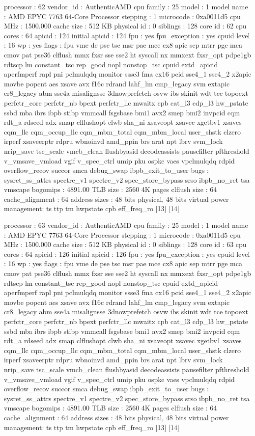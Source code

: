processor	: 62
vendor_id	: AuthenticAMD
cpu family	: 25
model		: 1
model name	: AMD EPYC 7763 64-Core Processor
stepping	: 1
microcode	: 0xa0011d5
cpu MHz		: 1500.000
cache size	: 512 KB
physical id	: 0
siblings	: 128
core id		: 62
cpu cores	: 64
apicid		: 124
initial apicid	: 124
fpu		: yes
fpu_exception	: yes
cpuid level	: 16
wp		: yes
flags		: fpu vme de pse tsc msr pae mce cx8 apic sep mtrr pge mca cmov pat pse36 clflush mmx fxsr sse sse2 ht syscall nx mmxext fxsr_opt pdpe1gb rdtscp lm constant_tsc rep_good nopl nonstop_tsc cpuid extd_apicid aperfmperf rapl pni pclmulqdq monitor ssse3 fma cx16 pcid sse4_1 sse4_2 x2apic movbe popcnt aes xsave avx f16c rdrand lahf_lm cmp_legacy svm extapic cr8_legacy abm sse4a misalignsse 3dnowprefetch osvw ibs skinit wdt tce topoext perfctr_core perfctr_nb bpext perfctr_llc mwaitx cpb cat_l3 cdp_l3 hw_pstate ssbd mba ibrs ibpb stibp vmmcall fsgsbase bmi1 avx2 smep bmi2 invpcid cqm rdt_a rdseed adx smap clflushopt clwb sha_ni xsaveopt xsavec xgetbv1 xsaves cqm_llc cqm_occup_llc cqm_mbm_total cqm_mbm_local user_shstk clzero irperf xsaveerptr rdpru wbnoinvd amd_ppin brs arat npt lbrv svm_lock nrip_save tsc_scale vmcb_clean flushbyasid decodeassists pausefilter pfthreshold v_vmsave_vmload vgif v_spec_ctrl umip pku ospke vaes vpclmulqdq rdpid overflow_recov succor smca debug_swap ibpb_exit_to_user
bugs		: sysret_ss_attrs spectre_v1 spectre_v2 spec_store_bypass srso ibpb_no_ret tsa vmscape
bogomips	: 4891.00
TLB size	: 2560 4K pages
clflush size	: 64
cache_alignment	: 64
address sizes	: 48 bits physical, 48 bits virtual
power management: ts ttp tm hwpstate cpb eff_freq_ro [13] [14]

processor	: 63
vendor_id	: AuthenticAMD
cpu family	: 25
model		: 1
model name	: AMD EPYC 7763 64-Core Processor
stepping	: 1
microcode	: 0xa0011d5
cpu MHz		: 1500.000
cache size	: 512 KB
physical id	: 0
siblings	: 128
core id		: 63
cpu cores	: 64
apicid		: 126
initial apicid	: 126
fpu		: yes
fpu_exception	: yes
cpuid level	: 16
wp		: yes
flags		: fpu vme de pse tsc msr pae mce cx8 apic sep mtrr pge mca cmov pat pse36 clflush mmx fxsr sse sse2 ht syscall nx mmxext fxsr_opt pdpe1gb rdtscp lm constant_tsc rep_good nopl nonstop_tsc cpuid extd_apicid aperfmperf rapl pni pclmulqdq monitor ssse3 fma cx16 pcid sse4_1 sse4_2 x2apic movbe popcnt aes xsave avx f16c rdrand lahf_lm cmp_legacy svm extapic cr8_legacy abm sse4a misalignsse 3dnowprefetch osvw ibs skinit wdt tce topoext perfctr_core perfctr_nb bpext perfctr_llc mwaitx cpb cat_l3 cdp_l3 hw_pstate ssbd mba ibrs ibpb stibp vmmcall fsgsbase bmi1 avx2 smep bmi2 invpcid cqm rdt_a rdseed adx smap clflushopt clwb sha_ni xsaveopt xsavec xgetbv1 xsaves cqm_llc cqm_occup_llc cqm_mbm_total cqm_mbm_local user_shstk clzero irperf xsaveerptr rdpru wbnoinvd amd_ppin brs arat npt lbrv svm_lock nrip_save tsc_scale vmcb_clean flushbyasid decodeassists pausefilter pfthreshold v_vmsave_vmload vgif v_spec_ctrl umip pku ospke vaes vpclmulqdq rdpid overflow_recov succor smca debug_swap ibpb_exit_to_user
bugs		: sysret_ss_attrs spectre_v1 spectre_v2 spec_store_bypass srso ibpb_no_ret tsa vmscape
bogomips	: 4891.00
TLB size	: 2560 4K pages
clflush size	: 64
cache_alignment	: 64
address sizes	: 48 bits physical, 48 bits virtual
power management: ts ttp tm hwpstate cpb eff_freq_ro [13] [14]

